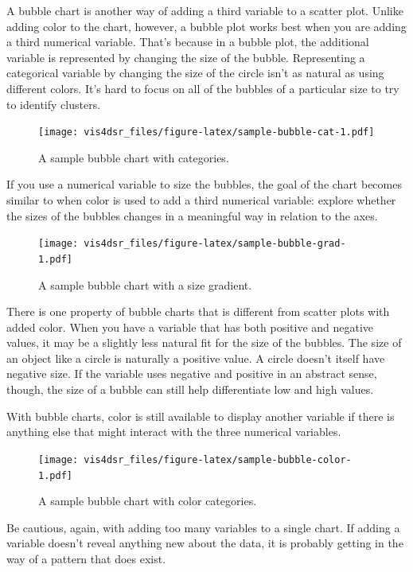 \documentclass[
]{krantz}
\begin{document}
A bubble chart is another way of adding a third variable to a scatter plot. Unlike
adding color to the chart, however, a bubble plot works best when you are adding a
third numerical variable. That's because in a bubble plot, the additional variable
is represented by changing the size of the bubble. Representing a categorical variable
by changing the size of the circle isn't as natural as using different colors. It's
hard to focus on all of the bubbles of a particular size to try to identify clusters.

\begin{figure}
\centering
\texttt{[image: vis4dsr\_files/figure-latex/sample-bubble-cat-1.pdf]}
\caption{\label{fig:sample-bubble-cat}A sample bubble chart with categories.}
\end{figure}

If you use a numerical variable to size the bubbles, the goal of the chart becomes
similar to when color is used to add a third numerical variable: explore whether
the sizes of the bubbles changes in a meaningful way in relation to the axes.

\begin{figure}
\centering
\texttt{[image: vis4dsr\_files/figure-latex/sample-bubble-grad-1.pdf]}
\caption{\label{fig:sample-bubble-grad}A sample bubble chart with a size gradient.}
\end{figure}

There is one property of bubble charts that is different from scatter plots with
added color. When you have a variable that has both positive and negative values,
it may be a slightly less natural fit for the size of the bubbles. The size of an
object like a circle is naturally a positive value. A circle doesn't itself have
negative size. If the variable uses negative and positive in an abstract sense,
though, the size of a bubble can still help differentiate low and high values.

With bubble charts, color is still available to display another variable if there
is anything else that might interact with the three numerical variables.

\begin{figure}
\centering
\texttt{[image: vis4dsr\_files/figure-latex/sample-bubble-color-1.pdf]}
\caption{\label{fig:sample-bubble-color}A sample bubble chart with color categories.}
\end{figure}

Be cautious, again, with adding too many variables to a single chart. If adding
a variable doesn't reveal anything new about the data, it is probably getting in the
way of a pattern that does exist.
\end{document}
